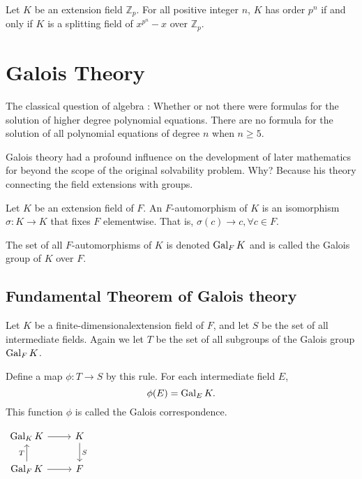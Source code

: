 \begin{theorem}
    Let $K$ be an extension field $\mathbb{Z}_p$. For all positive integer $n$, 
    $K$ has order $p^n$ if and only if $K$ is a splitting field of $x^{p^n} - x$ over $\mathbb{Z}_p$.
\end{theorem}

\section{Galois Theory}

The classical question of algebra : Whether or not there were formulas for the solution of higher degree polynomial 
equations. There are no formula for the solution of all polynomial equations of degree $n$ when $n \geq 5$.

Galois theory had a profound influence on the development of later mathematics for beyond the scope of 
the original solvability problem. Why? Because his theory connecting the field extensions with groups.

\begin{definition}
    Let $K$ be an extension field of $F$. An $F$-automorphism of $K$ is an isomorphism $\sigma : K \to K$ that 
    fixes $F$ elementwise. That is, $\sigma(c) \to c, \forall c \in F$.

    The set of all $F$-automorphisms of $K$ is denoted $\operatorname{Gal}_F K$ and is called the Galois group of $K$ over $F$.
\end{definition}

\subsection{Fundamental Theorem of Galois theory}

\begin{definition}
    Let $K$ be a finite-dimensionalextension field of $F$, and let 
    $S$ be the set of all intermediate fields. Again we let 
    $T$ be the set of all subgroups of the Galois group $\operatorname{Gal}_F K$.

    Define a map $\phi : T \to S$ by this rule. For each intermediate field $E$,
    \begin{equation}
        \phi(E) = \operatorname{Gal}_E K.
    \end{equation} 
    This function $\phi$ is called the Galois correspondence.

    \begin{center}
        $\begin{tikzcd}
            \gal_K K \arrow[r] 
            & K \arrow[d, "S"] \\
            \gal_F K \arrow[u,"T"] \arrow[r]
            & F
            \end{tikzcd}
        $
    \end{center}
\end{definition}


